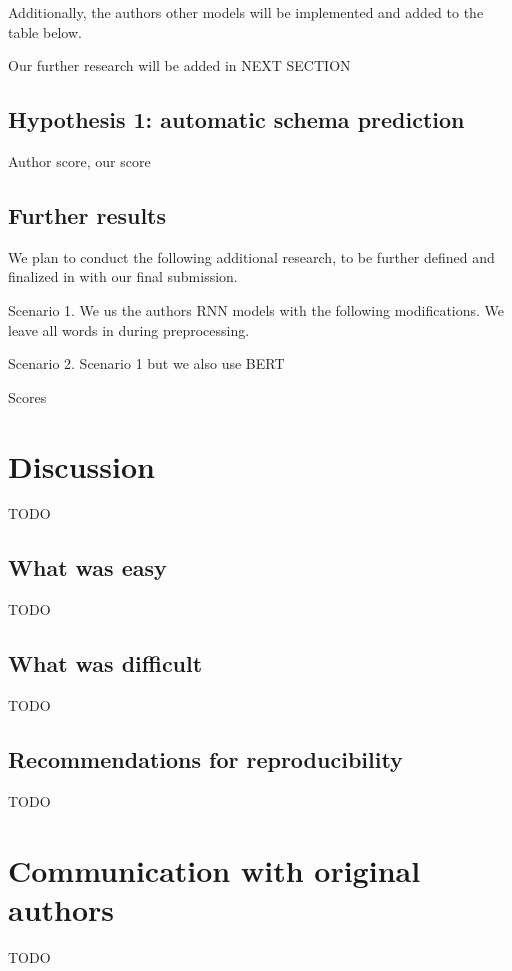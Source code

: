 \documentclass[11pt,a4paper]{article}
\begin{document}
Additionally, the authors other models will be implemented and added to the table below. 

Our further research will be added in NEXT SECTION 

\subsection{Hypothesis 1: automatic schema prediction}

Author score, our score 

\subsection{Further results}

We plan to conduct the following additional research, to be further defined and finalized in with our final submission. 

Scenario 1. We us the authors RNN models with the following modifications. We leave all words in during preprocessing. 

Scenario 2. Scenario 1 but we also use BERT 

Scores

\section{Discussion}
TODO
\subsection{What was easy}
TODO
\subsection{What was difficult}
TODO
\subsection{Recommendations for reproducibility}
TODO
\section{Communication with original authors}
TODO



\end{document}
